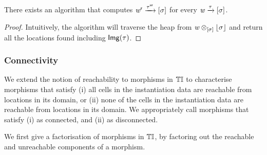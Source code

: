 \begin{lemma}\label{lem:reach-loc-dec}
    There exists an algorithm that computes $\mathit{w}^{\mathsf{r}} \xrightarrow{\tau^{\mathsf{ur}}} [\sigma]$ for every $\mathit{w} \xrightarrow\tau [\sigma]$.
\end{lemma}
\begin{proof} 
    Intuitively, the algorithm will traverse the heap from $\mathit{w} \otimes_{[\sigma]} \lfloor\sigma\rfloor$ and return all the locations found including $\mathsf{Img}(\tau)$. 
\end{proof}

\subsubsection{Connectivity}

We extend the notion of reachability to morphisms in ${\mathbb{T}\mathbb{I}}$ to characterise morphisms that satisfy 
(i) all cells in the instantiation data are reachable from locations in its domain, 
or (ii) none of the cells in the instantiation data are reachable from locations in its domain. 
We appropriately call morphisms that satisfy (i) as connected, and (ii) as disconnected.

We first give a factorisation of morphisms in ${\mathbb{T}\mathbb{I}}$, by factoring out the reachable and unreachable components of a morphism.

